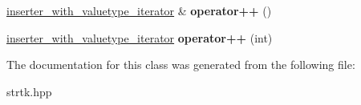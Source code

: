 \begin{DoxyCompactItemize}
\item 
\hypertarget{classstrtk_1_1inserter__with__valuetype__iterator_a0e272628c58868c156a68906ec4358aa}{\hyperlink{classstrtk_1_1inserter__with__valuetype__iterator}{inserter\-\_\-with\-\_\-valuetype\-\_\-iterator} \& {\bfseries operator++} ()}\label{classstrtk_1_1inserter__with__valuetype__iterator_a0e272628c58868c156a68906ec4358aa}

\item 
\hypertarget{classstrtk_1_1inserter__with__valuetype__iterator_ac975c4e31a74f8c69ae731df097fe3ef}{\hyperlink{classstrtk_1_1inserter__with__valuetype__iterator}{inserter\-\_\-with\-\_\-valuetype\-\_\-iterator} {\bfseries operator++} (int)}\label{classstrtk_1_1inserter__with__valuetype__iterator_ac975c4e31a74f8c69ae731df097fe3ef}

\end{DoxyCompactItemize}


The documentation for this class was generated from the following file\-:\begin{DoxyCompactItemize}
\item 
strtk.\-hpp\end{DoxyCompactItemize}
